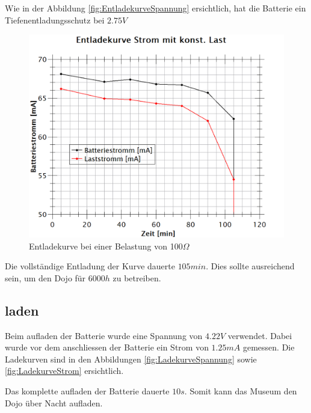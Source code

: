 Wie in der Abbildung \ref{fig:EntladekurveSpannung} ersichtlich, hat die Batterie ein Tiefenentladungsschutz bei $2.75V$

\begin{figure}[htb]
	\centering
	\includegraphics[width=\textwidth]{graphics/EnladekurveStrom.png}
	\caption{Entladekurve bei einer Belastung von 100$\Omega$}
	\label{fig:EntladekurveStrom}
\end{figure}



Die vollständige Entladung der Kurve dauerte $105min$. Dies sollte ausreichend sein, um den Dojo für $6000h$ zu betreiben.





\newpage

\subsection*{laden}
Beim aufladen der Batterie wurde eine Spannung von $4.22V$ verwendet. Dabei wurde vor dem anschliessen der Batterie ein Strom von $1.25mA$ gemessen. Die Ladekurven sind  in den Abbildungen \ref{fig:LadekurveSpannung} sowie \ref{fig:LadekurveStrom} ersichtlich.




Das komplette aufladen der Batterie dauerte $10s$. Somit kann das Museum den Dojo über Nacht aufladen.